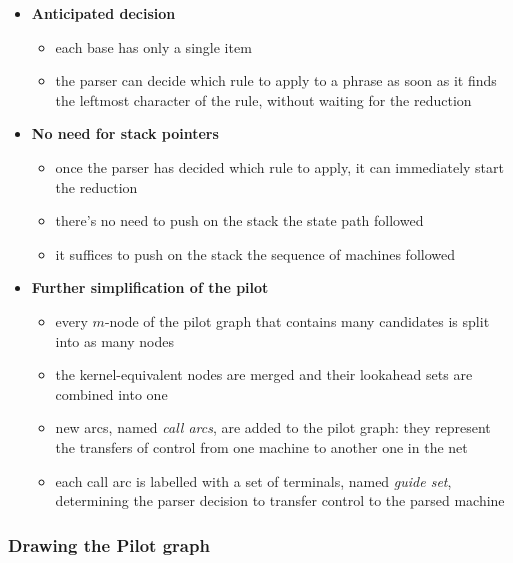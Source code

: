 \documentclass[english]{article}
\begin{document}
\begin{itemize}
  \item \textbf{Anticipated decision}
        \begin{itemize}[label=\(\rightarrow\)]
          \item each \mstate base has only a single item
          \item the parser can decide which rule to apply to a phrase as soon as it finds the leftmost character of the rule, without waiting for the reduction
        \end{itemize}
  \item \textbf{No need for stack pointers}
        \begin{itemize}[label=\(\rightarrow\)]
          \item once the parser has decided which rule to apply, it can immediately start the reduction
          \item there's no need to push on the stack the state path followed
          \item it suffices to push on the stack the sequence of machines followed
        \end{itemize}
  \item \textbf{Further simplification of the pilot}
        \begin{itemize}[label=\(\rightarrow\)]
          \item every \(m\)-node of the pilot graph that contains many candidates is split into as many nodes
          \item the kernel-equivalent nodes are merged and their lookahead sets are combined into one
          \item new arcs, named \textit{call arcs}, are added to the pilot graph: they represent the transfers of control from one machine to another one in the net
          \item each call arc is labelled with a set of terminals, named \textit{guide set}, determining the parser decision to transfer control to the parsed machine
        \end{itemize}
\end{itemize}

\subsubsection{Drawing the Pilot graph}
\end{document}
